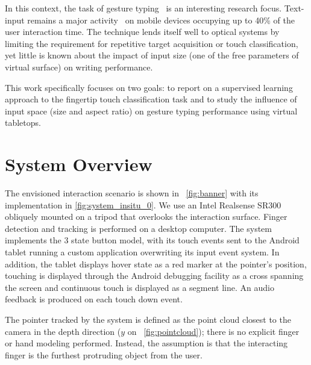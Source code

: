 \documentclass{chi-ext}
\begin{document}


In this context, the task of gesture typing~\cite{Kristensson2004} is an interesting research focus. Text-input remains a major activity~\cite{McGregor2014} on mobile devices occupying up to 40\% of the user interaction time. The technique lends itself well to optical systems by limiting the requirement for repetitive target acquisition or touch classification, yet little is known about the impact of input size (one of the free parameters of virtual surface) on writing performance.

This work specifically focuses on two goals: to report on a supervised learning approach to the fingertip touch classification task and to study the influence of input space (size and aspect ratio) on gesture typing performance using virtual tabletops.

\section{System Overview}
The envisioned interaction scenario is shown in ~\autoref{fig:banner} with its implementation in \autoref{fig:system_insitu_0}. We use an Intel Realsense SR300 obliquely mounted on a tripod that overlooks the interaction surface. Finger detection and tracking is performed on a desktop computer. The system implements the 3 state button model, with its touch events sent to the Android tablet running a custom application overwriting its input event system. In addition, the tablet displays hover state as a red marker at the pointer’s position, touching is displayed through the Android debugging facility as a cross spanning the screen and continuous touch is displayed as a segment line. An audio feedback is produced on each touch down event.

The pointer tracked by the system is defined as the point cloud closest to the camera in the depth direction ($y$ on ~\autoref{fig:pointcloud}); there is no explicit finger or hand modeling performed. Instead, the assumption is that the interacting finger is the furthest protruding object from the user.
\end{document}
